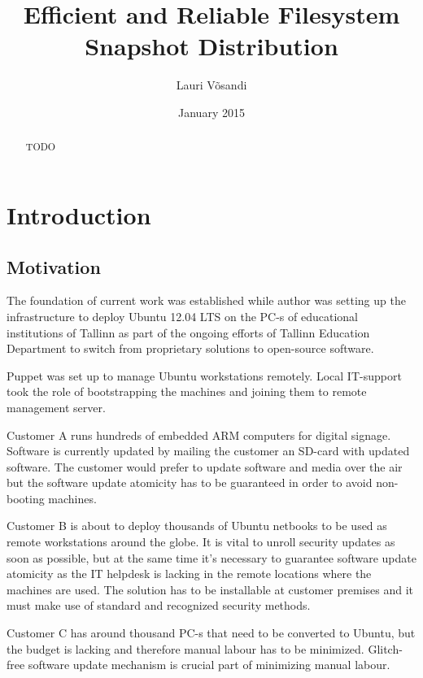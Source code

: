 \documentclass{article}
\title{Efficient and Reliable Filesystem Snapshot Distribution}
\author{Lauri Võsandi}
\date{January 2015}
\begin{document}
\maketitle


\begin{abstract}

TODO

\end{abstract}





\chapter{Introduction}


\section{Motivation}

The foundation of current work was established while author was setting up
the infrastructure to deploy Ubuntu 12.04 LTS on the PC-s of educational
institutions of Tallinn as part of the ongoing efforts of Tallinn Education
Department to switch from proprietary solutions to open-source software.

Puppet was set up to manage Ubuntu workstations remotely. Local IT-support
took the role of bootstrapping the machines and joining them to remote
management server.


Customer A runs hundreds of embedded ARM computers for digital signage.
Software is currently updated by mailing the customer an SD-card with
updated software. The customer would prefer to update software and
media over the air but the software update atomicity has to be guaranteed
in order to avoid non-booting machines.

Customer B is about to deploy thousands of Ubuntu netbooks to be used as
remote workstations around the globe. It is vital to unroll security updates
as soon as possible, but at the same time it's necessary to guarantee
software update atomicity as the IT helpdesk is lacking in the remote
locations where the machines are used.
The solution has to be installable at customer premises and it
must make use of standard and recognized security methods.

Customer C has around thousand PC-s that need to be converted to Ubuntu,
but the budget is lacking and therefore manual labour has to be minimized.
Glitch-free software update mechanism is crucial part of minimizing manual
labour.
\end{document}
